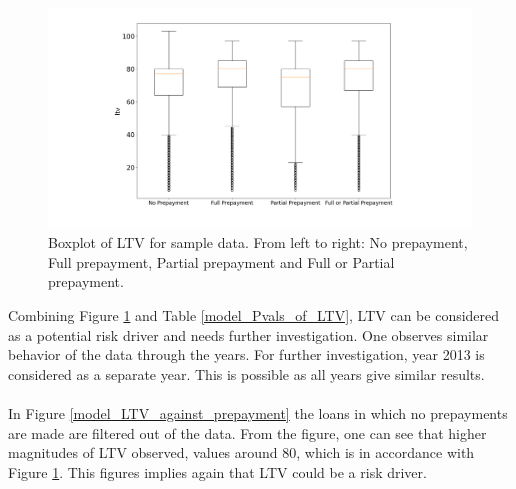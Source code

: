         \begin{figure}[H]
            \centering
            \includegraphics[width=\linewidth]{Figures/Boxplot_of_ltv_[2013, 2014, 2015, 2016, 2017, 2018, 2019, 2020]_.png}
            \caption{
                Boxplot of LTV for sample data.
                 From left to right: No prepayment, 
                 Full prepayment, Partial prepayment and Full or 
                 Partial prepayment.
                 }
            \label{model_boxplot_LTV}
        \end{figure}
        Combining Figure \ref{model_boxplot_LTV} and Table 
        \ref{model_Pvals_of_LTV}, LTV can be considered as a 
        potential risk driver and needs further investigation. One 
        observes similar behavior of the data through 
        the years. For further investigation, year 2013 is considered 
        as a separate year. This is possible as all years give similar 
        results.  
        \\\\
        In Figure \ref{model_LTV_against_prepayment} the loans in 
        which no prepayments are made are filtered out of the data. 
        From the figure, one can see that higher magnitudes of LTV  
        observed, values around 80, which is 
        in accordance with Figure \ref{model_boxplot_LTV}. This figures 
        implies again that LTV could be a risk driver. 
